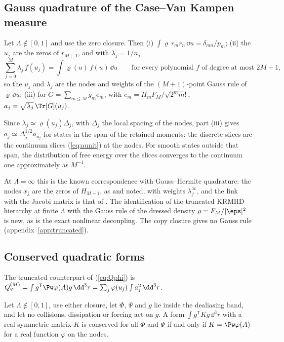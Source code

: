 \subsection{Gauss quadrature of the Case--Van Kampen measure}

\begin{proposition}\label{tr:gaussprop}
Let $\Lambda\notin[0,1]$ and use the zero closure. Then (i) $\int\varrho\,r_mr_n\,\dd u=\delta_{mn}/p_m$; (ii) the $u_j$ are the zeros of $r_{M+1}$, and with $\lambda_j=1/n_j$
\begin{equation}\label{eq:gauss}
  \sum_{j=0}^M\lambda_j\,f(u_j)=\int\varrho(u)\,f(u)\,\dd u\qquad\text{for every polynomial $f$ of degree at most $2M+1$,}
\end{equation}
so the $u_j$ and $\lambda_j$ are the nodes and weights of the $(M+1)$-point Gauss rule of $\varrho\,\dd u$; (iii) for $G=\sum_{m\le M}g_me_m$, with $e_m=H_mF_M/\sqrt{2^mm!}$, $a_j=\sqrt{\lambda_j}\,\Tr[G](u_j)$.
\end{proposition}

Since $\lambda_j\simeq\varrho(u_j)\Delta_j$, with $\Delta_j$ the local spacing of the nodes, part (iii) gives $a_j\simeq\Delta_j^{1/2}a_{u_j}$ for states in the span of the retained moments: the discrete slices are the continuum slices (\ref{eq:aunit}) at the nodes. For smooth states outside that span, the distribution of free energy over the slices converges to the continuum one approximately as $M^{-1}$.

At $\Lambda=\infty$ this is the known correspondence with Gauss--Hermite quadrature: the nodes $x_j$ are the zeros of $H_{M+1}$, as \citet{ParkerDellar2015} and \citet{Tassi2022} noted, with weights $\lambda^\infty_j$, and the link with the Jacobi matrix is that of \citet{GolubWelsch1969}. The identification of the truncated KRMHD hierarchy at finite $\Lambda$ with the Gauss rule of the dressed density $\varrho=F_M/|\eps|^2$ is new, as is the exact nonlinear decoupling. The copy closure gives no Gauss rule (appendix~\ref{app:truncated}).

\subsection{Conserved quadratic forms}

The truncated counterpart of (\ref{eq:Qphi}) is $Q^{(M)}_\varphi=\int g^{\mathsf T}\Pw\varphi(A)g\,\dd^3r=\sum_j\varphi(u_j)\int a_j^2\,\dd^3r$.

\begin{proposition}
Let $\Lambda\notin[0,1]$, use either closure, let $\Phi$, $\Psi$ and $g$ lie inside the dealiasing band, and let no collisions, dissipation or forcing act on $g$. A form $\int g^{\mathsf T}Kg\,\dd^3r$ with a real symmetric matrix $K$ is conserved for all $\Phi$ and $\Psi$ if and only if $K=\Pw\varphi(A)$ for a real function $\varphi$ on the nodes.
\end{proposition}

